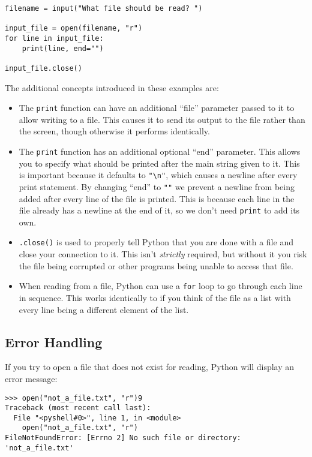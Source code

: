 \documentclass[11pt]{cselabheader}
\begin{document}
\begin{lstlisting}[style=python]
filename = input("What file should be read? ")

input_file = open(filename, "r")
for line in input_file:
    print(line, end="")

input_file.close()
\end{lstlisting}

The additional concepts introduced in these examples are:

\begin{itemize}
\item The \lstinline{print} function can have an additional ``file'' parameter passed to it to allow writing to a file. This causes it to send its output to the file rather than the screen, though otherwise it performs identically.

\item The \lstinline{print} function has an additional optional ``end'' parameter. This allows you to specify what should be printed after the main string given to it. This is important because it defaults to \lstinline{"\n"}, which causes a newline after every print statement. By changing ``end'' to \lstinline{""} we prevent a newline from being added after every line of the file is printed. This is because each line in the file already has a newline at the end of it, so we don't need \lstinline{print} to add its own.

\item \lstinline{.close()} is used to properly tell Python that you are done with a file and close your connection to it. This isn't \emph{strictly} required, but without it you risk the file being corrupted or other programs being unable to access that file.

\item When reading from a file, Python can use a \lstinline{for} loop to go through each line in sequence. This works identically to if you think of the file as a list with every line being a different element of the list.
\end{itemize}


\subsection{Error Handling}
If you try to open a file that does not exist for reading, Python will display an error message:

\begin{lstlisting}[style=ipython]
>>> open("not_a_file.txt", "r")9
Traceback (most recent call last):
  File "<pyshell#0>", line 1, in <module>
    open("not_a_file.txt", "r")
FileNotFoundError: [Errno 2] No such file or directory: 'not_a_file.txt'
\end{lstlisting}
\end{document}
